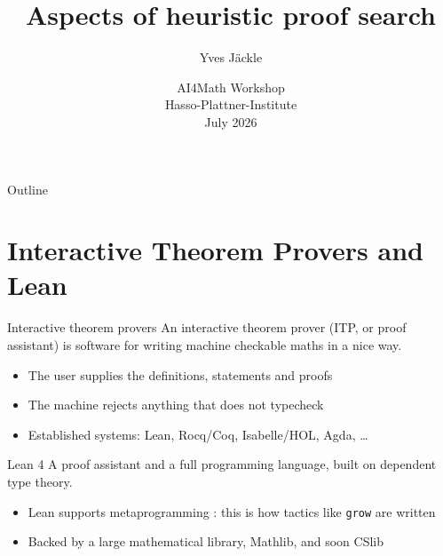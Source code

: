 \documentclass[aspectratio=169]{beamer}
\title[\leangrow]{Aspects of heuristic proof search}
\author[Yves Jäckle]{Yves Jäckle}
\date[AI4Math]{AI4Math Workshop\\Hasso-Plattner-Institute\\ July 2026}
\newcommand{\grow}{\texttt{grow}}      %
\begin{document}
\begin{frame}[plain]
  \titlepage
\end{frame}

\begin{frame}{Outline}
  \tableofcontents
\end{frame}

\section{Interactive Theorem Provers and Lean}

\begin{frame}{Interactive theorem provers}
  An \alert{interactive theorem prover} (ITP, or proof assistant) is
  software for writing machine checkable maths in a nice way.
  \medskip
  \begin{itemize}
    \item The user supplies the definitions, statements \alert{and proofs}
    \item The machine rejects anything that does not \alert{typecheck}
    \item Established systems: \alert{Lean}, Rocq/Coq, Isabelle/HOL, Agda, \dots
  \end{itemize}
  \medskip
  \begin{block}{Lean 4}
    A proof assistant and a full programming language, built on
    \alert{dependent type theory}.
    \begin{itemize}
      \item Lean supports \alert{metaprogramming} : this is how tactics like \grow{} are written
      \item Backed by a large mathematical library, \alert{Mathlib}, and soon \alert{CSlib}
    \end{itemize}
  \end{block}
\end{frame}

\end{document}
